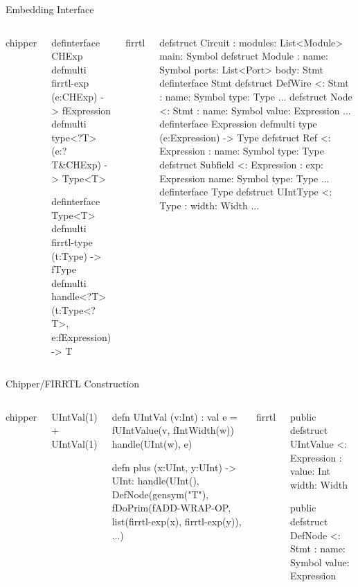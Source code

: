 \documentclass[xcolor=pdflatex,dvipsnames,table]{beamer}
\begin{document}
\begin{frame}[fragile]{Embedding Interface}
\begin{columns}


chipper
{
\begin{scala}
definterface CHExp
defmulti firrtl-exp (e:CHExp) -> fExpression
defmulti type<?T> (e:?T&CHExp) -> Type<T>

definterface Type<T>
defmulti firrtl-type (t:Type) -> fType
defmulti handle<?T> (t:Type<?T>, e:fExpression) -> T
\end{scala}
}


firrtl
{
\begin{scala}
defstruct Circuit :
   modules: List<Module>
   main: Symbol
defstruct Module :
   name: Symbol
   ports: List<Port>
   body: Stmt
definterface Stmt
defstruct DefWire <: Stmt :
   name: Symbol
   type: Type
...
defstruct Node <: Stmt :
   name: Symbol
   value: Expression
...
definterface Expression
defmulti type (e:Expression) -> Type
defstruct Ref <: Expression :
   name: Symbol
   type: Type
defstruct Subfield <: Expression :
   exp: Expression
   name: Symbol
   type: Type
...
definterface Type
defstruct UIntType <: Type :
   width: Width
...
\end{scala}
}
\end{columns}

\end{frame}

\begin{frame}[fragile]{Chipper/FIRRTL Construction}

\begin{columns}

chipper
\begin{stanza}
UIntVal(1) + UIntVal(1)
\end{stanza}

{
\begin{stanza}
defn UIntVal (v:Int) :
  val e = fUIntValue(v, fIntWidth(w))
  handle(UInt(w), e)

defn plus (x:UInt, y:UInt) -> UInt:
  handle(UInt(),
         DefNode(gensym("T"),
                 fDoPrim(fADD-WRAP-OP,
                         list(firrtl-exp(x),
                              firrtl-exp(y)), 
                         ...)
\end{stanza}
}


firrtl
{
\begin{stanza}
public defstruct UIntValue <: Expression :
  value: Int
  width: Width

public defstruct DefNode <: Stmt :
   name: Symbol
   value: Expression
\end{stanza}
}

\end{columns}

\end{frame}
\end{document}
